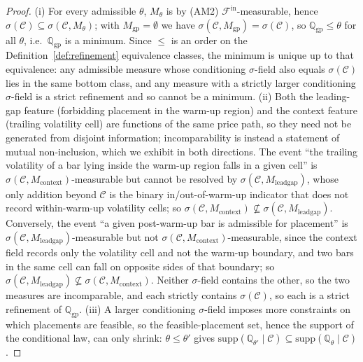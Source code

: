 \documentclass[risks,article,submit,pdftex,oneauthor]{Definitions/mdpi}
\begin{document}
\begin{proof}
(i) For every admissible $\theta$, $M_\theta$ is by (AM2)
$\mathcal F^{\mathrm{in}}$-measurable, hence
$\sigma(\mathcal C)\subseteq\sigma(\mathcal C,M_\theta)$; with
$M_{\mathrm{gp}}=\emptyset$ we have $\sigma(\mathcal C,M_{\mathrm{gp}})=
\sigma(\mathcal C)$, so $\mathbb{Q}_{\mathrm{gp}}\le\theta$ for all $\theta$, i.e.\
$\mathbb{Q}_{\mathrm{gp}}$ is a minimum. Since $\le$ is an order on the
Definition~\ref{def:refinement} equivalence classes, the minimum is unique up to
that equivalence: any admissible measure whose conditioning $\sigma$-field also
equals $\sigma(\mathcal C)$ lies in the same bottom class, and any measure with a
strictly larger conditioning $\sigma$-field is a strict refinement and so cannot be
a minimum. (ii) Both the leading-gap feature
(forbidding placement in the warm-up region) and the context feature (trailing
volatility cell) are functions of the same price path, so they need not be generated
from disjoint information; incomparability is instead a statement of mutual
non-inclusion, which we exhibit in both directions. The event ``the trailing
volatility of a bar lying inside the warm-up region falls in a given cell'' is
$\sigma(\mathcal C,M_{\mathrm{context}})$-measurable but cannot be resolved by
$\sigma(\mathcal C,M_{\mathrm{leadgap}})$, whose only addition beyond $\mathcal C$
is the binary in/out-of-warm-up indicator that does not record within-warm-up
volatility cells; so $\sigma(\mathcal C,M_{\mathrm{context}})\not\subseteq
\sigma(\mathcal C,M_{\mathrm{leadgap}})$. Conversely, the event ``a given
post-warm-up bar is admissible for placement'' is
$\sigma(\mathcal C,M_{\mathrm{leadgap}})$-measurable but not
$\sigma(\mathcal C,M_{\mathrm{context}})$-measurable, since the context field
records only the volatility cell and not the warm-up boundary, and two bars in the
same cell can fall on opposite sides of that boundary; so
$\sigma(\mathcal C,M_{\mathrm{leadgap}})\not\subseteq
\sigma(\mathcal C,M_{\mathrm{context}})$. Neither $\sigma$-field contains the other,
so the two measures are incomparable, and each strictly contains
$\sigma(\mathcal C)$, so each is a strict refinement of $\mathbb{Q}_{\mathrm{gp}}$. (iii) A larger conditioning $\sigma$-field imposes more
constraints on which placements are feasible, so the feasible-placement set, hence
the support of the conditional law, can only shrink: $\theta\le\theta'$ gives
$\mathrm{supp}(\mathbb{Q}_{\theta'}\mid\mathcal C)\subseteq
\mathrm{supp}(\mathbb{Q}_{\theta}\mid\mathcal C)$.
\end{proof}
\end{document}
